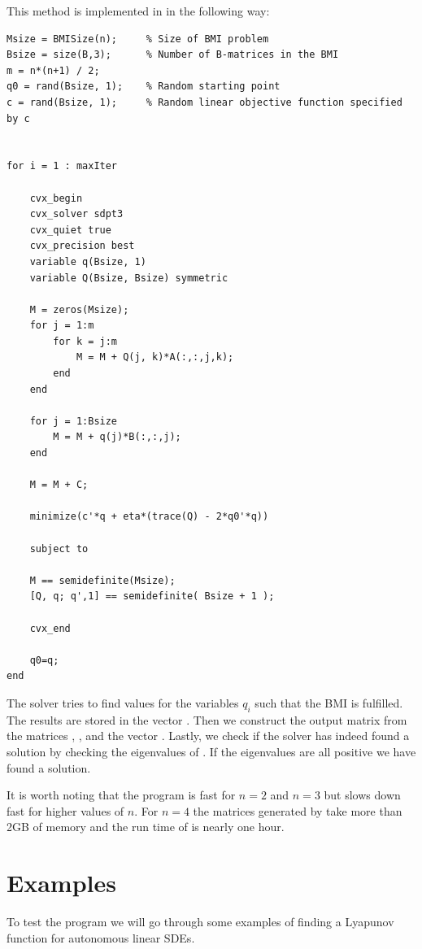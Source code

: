 \documentclass[a4paper,12pt,twoside,BCOR=10mm]{scrbook}
\begin{document}
This method is implemented in  in the following way:
\begin{lstlisting}
Msize = BMISize(n);     % Size of BMI problem
Bsize = size(B,3);      % Number of B-matrices in the BMI
m = n*(n+1) / 2;        
q0 = rand(Bsize, 1);    % Random starting point
c = rand(Bsize, 1);     % Random linear objective function specified by c


for i = 1 : maxIter 

    cvx_begin
    cvx_solver sdpt3
    cvx_quiet true
    cvx_precision best
    variable q(Bsize, 1)               
    variable Q(Bsize, Bsize) symmetric      
    
    M = zeros(Msize);
    for j = 1:m
        for k = j:m
            M = M + Q(j, k)*A(:,:,j,k);
        end
    end
    
    for j = 1:Bsize
        M = M + q(j)*B(:,:,j);
    end
    
    M = M + C;

    minimize(c'*q + eta*(trace(Q) - 2*q0'*q)) 

    subject to

    M == semidefinite(Msize);
    [Q, q; q',1] == semidefinite( Bsize + 1 );

    cvx_end
    
    q0=q;  
end
\end{lstlisting}

The solver tries to find values for the variables $q_i$ such that the BMI is fulfilled. The results are stored in the vector . Then we construct the output matrix  from the matrices , ,  and the vector . Lastly, we check if the solver has indeed found a solution by checking the eigenvalues of . If the eigenvalues are all positive we have found a solution.

It is worth noting that the program is fast for $n = 2$ and $n = 3$ but slows down fast for higher values of $n$. For $n = 4$ the matrices generated by  take more than 2GB of memory and the run time of  is nearly one hour.

\section{Examples}\label{SectionExamples}
To test the program we will go through some examples of finding a Lyapunov function for autonomous linear SDEs.
\end{document}
